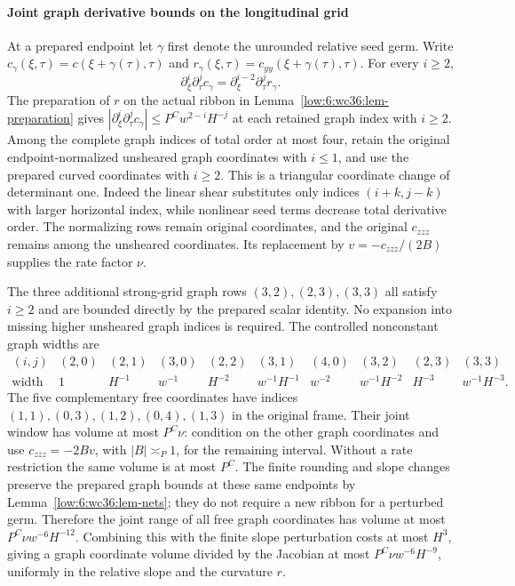 \documentclass[11pt]{amsart}
\theoremstyle{definition}
\theoremstyle{remark}
\numberwithin{equation}{section}
\begin{document}
\paragraph{Joint graph derivative bounds on the longitudinal grid}\label{low:6:wc36:graph-window}

At a prepared endpoint let $\gamma$ first denote the unrounded relative seed germ. Write $c_\gamma(\xi,\tau)=c(\xi+\gamma(\tau),\tau)$ and $r_\gamma(\xi,\tau)=c_{yy}(\xi+\gamma(\tau),\tau)$. For every $i\ge2$,
\[
\partial_\xi^i\partial_\tau^j c_\gamma=\partial_\xi^{i-2}\partial_\tau^j r_\gamma.
\]
The preparation of $r$ on the actual ribbon in Lemma~\ref{low:6:wc36:lem-preparation} gives $|\partial_\xi^i\partial_\tau^jc_\gamma|\le P^Cw^{2-i}H^{-j}$ at each retained graph index with $i\ge2$. Among the complete graph indices of total order at most four, retain the original endpoint-normalized unsheared graph coordinates with $i\le1$, and use the prepared curved coordinates with $i\ge2$. This is a triangular coordinate change of determinant one. Indeed the linear shear substitutes only indices $(i+k,j-k)$ with larger horizontal index, while nonlinear seed terms decrease total derivative order. The normalizing rows remain original coordinates, and the original $c_{zzz}$ remains among the unsheared coordinates. Its replacement by $v=-c_{zzz}/(2B)$ supplies the rate factor $\nu$.

The three additional strong-grid graph rows $(3,2),(2,3),(3,3)$ all satisfy $i\ge2$ and are bounded directly by the prepared scalar identity. No expansion into missing higher unsheared graph indices is required. The controlled nonconstant graph widths are
\[
\begin{array}{c|ccccccccc}
(i,j)&(2,0)&(2,1)&(3,0)&(2,2)&(3,1)&(4,0)&(3,2)&(2,3)&(3,3)\\\hline
\text{width}&1&H^{-1}&w^{-1}&H^{-2}&w^{-1}H^{-1}&w^{-2}&w^{-1}H^{-2}&H^{-3}&w^{-1}H^{-3}.
\end{array}
\]
The five complementary free coordinates have indices $(1,1),(0,3),(1,2),(0,4),(1,3)$ in the original frame. Their joint window has volume at most $P^C\nu$: condition on the other graph coordinates and use $c_{zzz}=-2Bv$, with $|B|\asymp_P1$, for the remaining interval. Without a rate restriction the same volume is at most $P^C$. The finite rounding and slope changes preserve the prepared graph bounds at these same endpoints by Lemma~\ref{low:6:wc36:lem-nets}; they do not require a new ribbon for a perturbed germ. Therefore the joint range of all free graph coordinates has volume at most $P^C\nu w^{-6}H^{-12}$. Combining this with the finite slope perturbation costs at most $H^3$, giving a graph coordinate volume divided by the Jacobian at most $P^C\nu w^{-6}H^{-9}$, uniformly in the relative slope and the curvature $r$.
\end{document}
